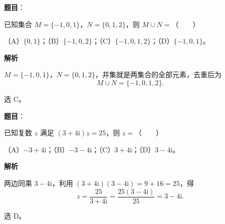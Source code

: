 

\begin{answer}

\textbf{题目}：

已知集合 $M=\{-1,0,1\}$，$N=\{0,1,2\}$，则 $M\cup N=$\mbox{（　　）}

（A）$\{0,1\}$；（B）$\{-1,0,2\}$；（C）$\{-1,0,1,2\}$；（D）$\{-1,0,1\}$。

\textbf{解析}

$M=\{-1,0,1\}$，$N=\{0,1,2\}$，并集就是两集合的全部元素，去重后为
\nopagebreak[4]
\[M\cup N=\{-1,0,1,2\}.\]

选 C。


\end{answer}
\begin{answer}

\textbf{题目}：

已知复数 $z$ 满足 $(3+4\mathrm i)z=25$，则 $z=$\mbox{（　　）}

（A）$-3+4\mathrm i$；（B）$-3-4\mathrm i$；（C）$3+4\mathrm i$；（D）$3-4\mathrm i$。

\textbf{解析}

两边同乘 $3-4\mathrm i$，利用 $(3+4\mathrm i)(3-4\mathrm i)=9+16=25$，得
\nopagebreak[4]
\[z=\frac{25}{3+4\mathrm i}=\frac{25(3-4\mathrm i)}{25}=3-4\mathrm i.\]

选 D。


\end{answer}
